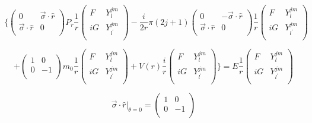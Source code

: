 \documentclass{report}
\begin{document}
\[\lbrace \left ( \begin{array}{cc}
 0 & \overrightarrow{\sigma} \cdot \hat{r}   \\
 \overrightarrow{\sigma} \cdot \hat{r} & 0   \\
 \end{array} \right) P_r \frac{1}{r} \left ( \begin{array}{cc}
 F & Y_{l}^{jm}   \\
 iG & Y_{l^{\prime}}^{jm}   \\
 \end{array} \right) - \frac{i}{2r} \pi (2j+1) \left ( \begin{array}{cc}
 0 & -\overrightarrow{\sigma}\cdot \hat{r}   \\
 \overrightarrow{\sigma} \cdot \hat{r} & 0   \\
 \end{array} \right) \frac{1}{r} \left ( \begin{array}{cc}
 F & Y_{l}^{jm}   \\
 iG & Y_{l^{\prime}}^{jm}   \\
 \end{array} \right)\]

\[+ \left ( \begin{array}{cc}
 1 & 0   \\
 0 & -1   \\
 \end{array} \right) m_0 \frac{1}{r} \left ( \begin{array}{cc}
 F & Y_{l}^{jm}   \\
 iG & Y_{l^{\prime}}^{jm}   \\
 \end{array} \right) + V(r) \frac{i}{r} \left ( \begin{array}{cc}
 F & Y_{l}^{jm}   \\
 iG & Y_{l^{\prime}}^{jm}   \\
 \end{array} \right) \rbrace = E \frac{1}{r} \left ( \begin{array}{cc}
 F & Y_{l}^{jm}   \\
 iG & Y_{l^{\prime}}^{jm}   \\
 \end{array} \right) \]

\[\overrightarrow{\sigma} \cdot \hat{r} |_{\theta = 0} = \left ( \begin{array}{cc}
 1 & 0   \\
 0 & -1   \\
 \end{array} \right) \]
\end{document}
